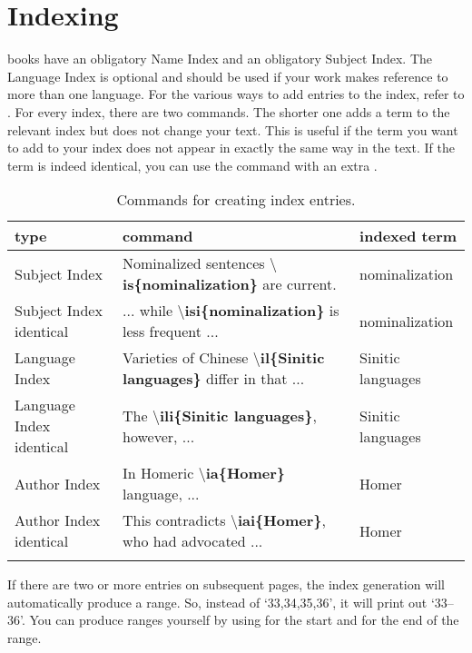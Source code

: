 \chapter{Indexing}
\lsp books have an obligatory Name Index and an obligatory Subject Index. The Language Index is optional and should be used if your work makes reference to more than one language. 
For the various ways to add entries to the index, refer to . For every index, there are two commands. The shorter one adds a term to the relevant index but does not change your text. This is useful if the term you want to add to your index does not appear in exactly the same way in the text. If the term is indeed identical, you can use the command with an extra .

\begin{table}[h]
\caption{Commands for creating index entries.}
\label{tab:latex:indexentriese}
 \begin{tabular}{p{2.5cm}>{\tt\small\raggedright}p{6.5cm}p{3cm}}
  \lsptoprule
  type & \rm\normalsize command & indexed term \\
  \midrule
  Subject Index& Nominalized sentences \textbf{$\setminus$is\{nominalization\}} are current. & nomina\-lization \\
  Subject Index identical& ... while \textbf{$\setminus$isi\{nominalization\}} is less frequent ...  & nomina\-lization \\[2em]
  Language Index & Varieties of Chinese \textbf{$\setminus$il\{Sinitic languages\}} differ in that ...& Sinitic languages \\
  Language Index identical& The \textbf{$\setminus$ili\{Sinitic languages\}}, \mbox{however}, ... & Sinitic languages \\[2em]
  Author Index & In Homeric \textbf{$\setminus$ia\{Homer\}} language, ...  & Homer\\
  Author Index identical & This contradicts \textbf{$\setminus$iai\{Homer\}}, who had advocated ... & Homer \\
  \lspbottomrule
 \end{tabular}
\end{table}

If there are two or more entries on subsequent pages, the index generation will automatically produce a range. So, instead of `33,34,35,36', it will print out `33--36'. You can produce ranges yourself by using  for the start and   for the end of the range. 

